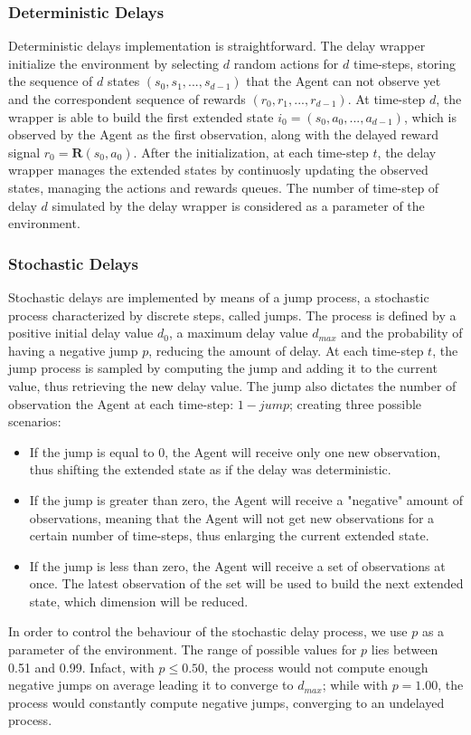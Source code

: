             \subsubsection{Deterministic Delays}
                Deterministic delays implementation is straightforward. The delay wrapper initialize the environment by selecting $d$ random actions for $d$ time-steps, storing the sequence of $d$ states $(s_0, s_1, ..., s_{d-1})$ that the Agent can not observe yet and the correspondent sequence of rewards $(r_0, r_1, ..., r_{d-1})$. At time-step $d$, the wrapper is able to build the first extended state $i_0 = (s_0, a_0, ..., a_{d-1})$, which is observed by the Agent as the first observation, along with the delayed reward signal $r_0 = \mathbf{R}(s_0, a_0)$. After the initialization, at each time-step $t$, the delay wrapper manages the extended states by continuosly updating the observed states, managing the actions and rewards queues. The number of time-step of delay $d$ simulated by the delay wrapper is considered as a parameter of the environment.
            
            \subsubsection{Stochastic Delays}
                Stochastic delays are implemented by means of a jump process, a stochastic process characterized by discrete steps, called jumps. The process is defined by a positive initial delay value $d_0$, a maximum delay value $d_{max}$ and the probability of having a negative jump $p$, reducing the amount of delay. At each time-step $t$, the jump process is sampled by computing the jump and adding it to the current value, thus retrieving the new delay value. The jump also dictates the number of observation the Agent at each time-step: $1-jump$; creating three possible scenarios:
                \begin{itemize}
                    \item If the jump is equal to 0, the Agent will receive only one new observation, thus shifting the extended state as if the delay was deterministic.
                    \item If the jump is greater than zero, the Agent will receive a "negative" amount of observations, meaning that the Agent will not get new observations for a certain number of time-steps, thus enlarging the current extended state.
                    \item If the jump is less than zero, the Agent will receive a set of observations at once. The latest observation of the set will be used to build the next extended state, which dimension will be reduced. 
                \end{itemize}
                In order to control the behaviour of the stochastic delay process, we use $p$ as a parameter of the environment. The range of possible values for $p$ lies between 0.51 and 0.99. Infact, with $p \leq 0.50$, the process would not compute enough negative jumps on average leading it to converge to $d_{max}$; while with $p = 1.00$, the process would constantly compute negative jumps, converging to an undelayed process.
                
